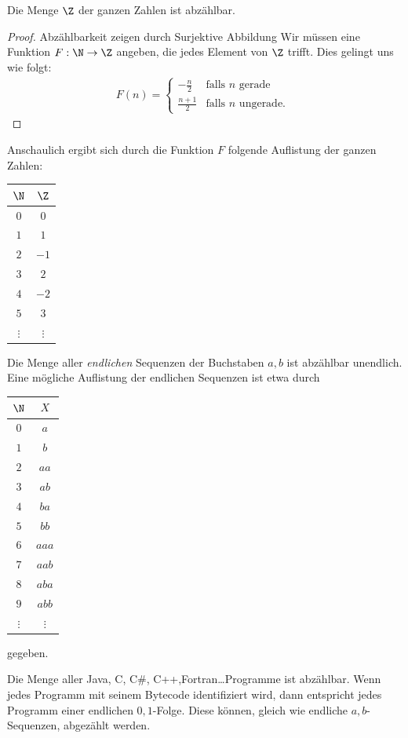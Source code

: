 \begin{example}
Die Menge $\Z$ der ganzen Zahlen ist abzählbar.
\begin{proof}{Abzählbarkeit zeigen durch Surjektive Abbildung}
Wir müssen eine Funktion $F:\N\to\Z$ angeben, die jedes Element von $\Z$ trifft. Dies gelingt uns wie folgt:
\begin{align*}
F(n)=\begin{cases}
-\frac{n}{2} &\text{falls $n$ gerade}\\
\frac{n+1}{2}&\text{falls $n$ ungerade. }
\end{cases}
\end{align*}
\end{proof}
Anschaulich ergibt sich durch die Funktion $F$ folgende Auflistung der ganzen Zahlen:
\begin{center}
\begin{tabular}{c|c}
$\N$ & $\Z$\\
\hline
$0$ & $0$\\
$1$ & $1$\\
$2$ & $-1$\\
$3$ & $2$\\
$4$ & $-2$\\
$5$ & $3$\\
$\vdots$ & $\vdots$
\end{tabular}
\end{center}
\end{example}

\begin{example}
Die Menge aller \textit{endlichen} Sequenzen der Buchstaben $a,b$ ist abzählbar unendlich. Eine mögliche Auflistung der endlichen Sequenzen ist etwa durch
\begin{center}
\begin{tabular}{c|c}
$\N$ & $X$\\
\hline
$0$ & $a$\\
$1$ & $b$\\
$2$ & $aa$\\
$3$&$ab$\\
$4$&$ba$\\
$5$&$bb$\\
$6$&$aaa$\\
$7$ & $aab$\\
$8$ & $aba$\\
$9$ & $abb$\\
$\vdots$ & $\vdots$
\end{tabular}
\end{center}
gegeben.
\end{example}
\begin{example}
Die Menge aller Java, C, C\#, C++,Fortran\dots Programme ist abzählbar.
\tcblower
Wenn jedes Programm mit seinem Bytecode identifiziert wird, dann entspricht jedes Programm einer endlichen $0,1$-Folge. Diese können, gleich wie endliche $a,b$-Sequenzen, abgezählt werden.
\end{example}


